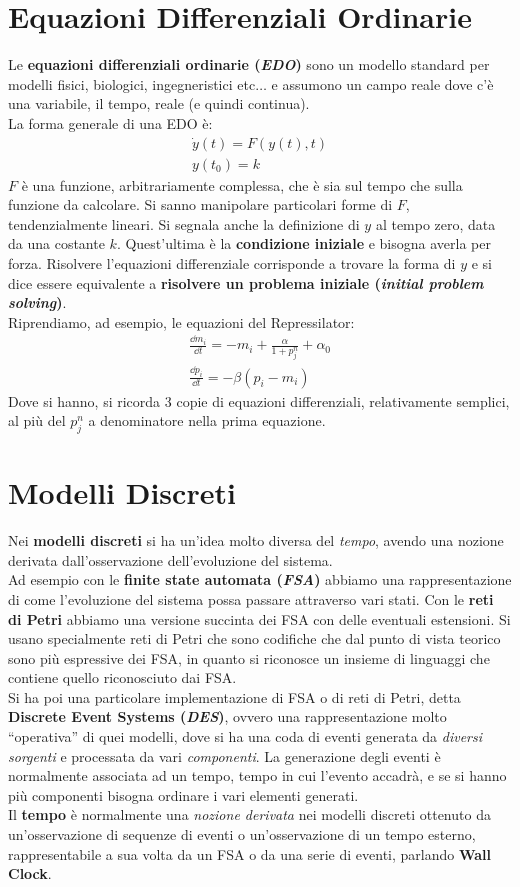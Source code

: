 \documentclass[a4paper,12pt, oneside]{book}
\begin{document}
\section{Equazioni Differenziali Ordinarie}
Le \textbf{equazioni differenziali ordinarie (\textit{EDO})} sono un modello
standard per modelli fisici, biologici, ingegneristici etc$\ldots$ e assumono un
campo reale dove c'è una variabile, il tempo, reale (e quindi continua).\\
La forma generale di una EDO è:
\begin{gather*}
  \dot{y}(t)=F(y(t),t)\\
  y(t_0)=k
\end{gather*}
$F$ è una funzione, arbitrariamente complessa, che è sia sul tempo che sulla
funzione da calcolare. Si sanno manipolare particolari forme di $F$,
tendenzialmente lineari. Si segnala anche la definizione di $y$ al tempo zero,
data da una costante $k$. Quest'ultima è la \textbf{condizione iniziale} e
bisogna averla per forza. Risolvere l'equazioni differenziale corrisponde a
trovare la forma di $y$ e si dice essere equivalente a \textbf{risolvere un
  problema iniziale (\textit{initial problem solving})}.\\
Riprendiamo, ad esempio, le equazioni del Repressilator:
\begin{gather*}
  \frac{\dd{m_i}}{\dd{t}}=-m_i+\frac{\alpha}{1+p_j^n}+\alpha_0\\
  \frac{\dd{p_i}}{\dd{t}}=-\beta(p_i-m_i)
\end{gather*} 
Dove si hanno, si ricorda 3 copie di equazioni differenziali, relativamente
semplici, al più del $p_j^n$ a denominatore nella prima equazione.
\section{Modelli Discreti}
Nei \textbf{modelli discreti} si ha un'idea molto diversa del \textit{tempo},
avendo una nozione derivata dall'osservazione dell'evoluzione del sistema.\\
Ad esempio con le \textbf{finite state automata (\textit{FSA})} abbiamo una
rappresentazione di come l'evoluzione del sistema possa passare attraverso vari
stati. Con le \textbf{reti di Petri} abbiamo una versione succinta dei FSA con
delle eventuali estensioni. Si usano specialmente reti di Petri che sono
codifiche che dal punto di vista teorico sono più espressive dei FSA, in
quanto si riconosce un insieme di linguaggi che contiene quello riconosciuto
dai FSA.\\
Si ha poi una particolare implementazione di FSA o di reti di Petri, detta
\textbf{Discrete Event Systems (\textit{DES})}, ovvero una rappresentazione
molto ``operativa'' di quei modelli, dove si ha una coda di eventi generata da
\textit{diversi sorgenti} e processata da vari \textit{componenti}. La
generazione degli eventi è normalmente associata ad un tempo, tempo in cui
l'evento accadrà, e se si hanno più componenti bisogna ordinare i vari elementi
generati. \\
Il \textbf{tempo} è normalmente una \textit{nozione derivata} nei modelli
discreti ottenuto da un'osservazione di sequenze di eventi o un'osservazione di
un tempo esterno, rappresentabile a sua volta da un FSA o da una serie di
eventi, parlando \textbf{Wall Clock}.
\end{document}
